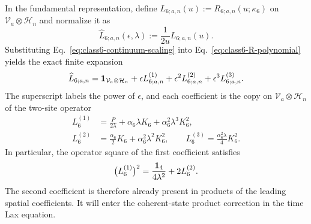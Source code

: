 In the fundamental representation, define
$L_{6;a,n}(u):=R_{6;a,n}(u;\kappa_6)$ on
$\mathcal V_a\otimes\mathcal H_n$ and normalize it as
\begin{equation}
\widehat L_{6;a,n}(\epsilon,\lambda)
:=\frac{1}{2u}L_{6;a,n}(u).
\label{eq:class6-normalized-L}
\end{equation}
Substituting Eq.~\eqref{eq:class6-continuum-scaling} into
Eq.~\eqref{eq:class6-R-polynomial} yields the exact finite expansion
\begin{equation}
\widehat L_{6;a,n}
=\mathbf{1}_{\mathcal V_a\otimes\mathcal H_n}
+\epsilon L^{(1)}_{6;a,n}
+\epsilon^2 L^{(2)}_{6;a,n}
+\epsilon^3 L^{(3)}_{6;a,n}.
\label{eq:class6-L-expansion}
\end{equation}
The superscript labels the power of $\epsilon$, and each coefficient is
the copy on $\mathcal V_a\otimes\mathcal H_n$ of the two-site operator
\begin{align}
L^{(1)}_6
&=\frac{P}{2\lambda}
+\alpha_6\lambda K_6+\alpha_6^2\lambda^3K_6^2,
\label{eq:class6-L-first-coefficient}\\
L^{(2)}_6
&=\frac{\alpha_6}{2}K_6+\alpha_6^2\lambda^2K_6^2,
\qquad
L^{(3)}_6=\frac{\alpha_6^2\lambda}{4}K_6^2.
\label{eq:class6-L-higher-coefficients}
\end{align}
In particular, the operator square of the first coefficient satisfies
\begin{equation}
\bigl(L^{(1)}_6\bigr)^2
=\frac{\mathbf{1}_4}{4\lambda^2}+2L^{(2)}_6.
\label{eq:class6-L-first-square}
\end{equation}
The second coefficient is therefore already present in products of the
leading spatial coefficients.  It will enter the coherent-state product
correction in the time Lax equation.

